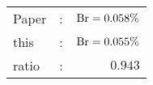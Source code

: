       \begin{tabular}{lcr}
          Paper &:& $\mathrm{Br}  = 0.058\%$ \\
          this      &:& $\mathrm{Br}  = 0.055\%$ \\
		  ratio   &:& $0.943$ \\
      \end{tabular}
